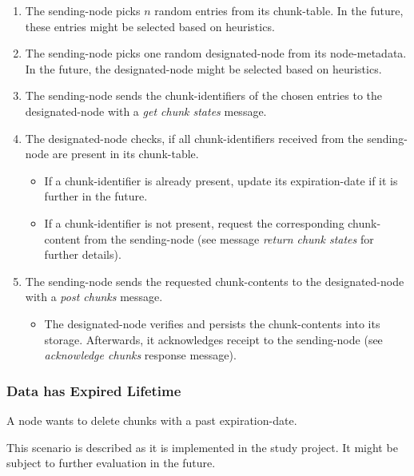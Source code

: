 \begin{enumerate}
    \item The \gls{sending-node} picks $n$ random entries from its \gls{chunk-table}. In the future, these entries might be selected based on heuristics.
    \item The \gls{sending-node} picks one random \gls{designated-node} from its \gls{node-metadata}. In the future, the \gls{designated-node} might be selected based on heuristics.
    \item The \gls{sending-node} sends the \glspl{chunk-identifier} of the chosen entries to the \gls{designated-node} with a \emph{get chunk states} message.
    \item The \gls{designated-node} checks, if all \glspl{chunk-identifier} received from the \gls{sending-node} are present in its \gls{chunk-table}.
        \begin{itemize}
            \item If a \gls{chunk-identifier} is already present, update its \gls{expiration-date} if it is further in the future.
            \item If a \gls{chunk-identifier} is not present, request the corresponding \gls{chunk-content} from the \gls{sending-node} (see message \emph{return chunk states} for further details).
        \end{itemize}
    \item The \gls{sending-node} sends the requested \glspl{chunk-content} to the \gls{designated-node} with a \emph{post chunks} message.
        \begin{itemize}
            \item The \gls{designated-node} verifies and persists the \glspl{chunk-content} into its \gls{storage}. Afterwards, it acknowledges receipt to the \gls{sending-node} (see \emph{acknowledge chunks} response message).
        \end{itemize}
\end{enumerate}

\subsubsection{Data has Expired Lifetime}\label{sec:scenario-data-expiration}
A \gls{node} wants to delete \glspl{chunk} with a past \gls{expiration-date}.

This scenario is described as it is implemented in the study project. It might be subject to further evaluation in the future.

